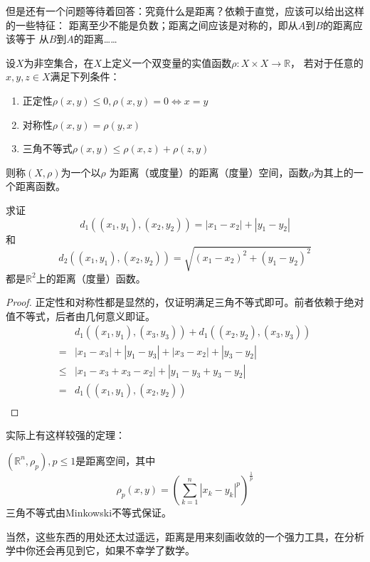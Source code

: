 但是还有一个问题等待着回答：究竟什么是距离？依赖于直觉，应该可以给出这样的一些特征：
距离至少不能是负数；距离之间应该是对称的，即从\(A\)到\(B\)的距离应该等于
从\(B\)到\(A\)的距离……
\begin{definition}[距离空间]
    设$X$为非空集合，在$X$上定义一个双变量的实值函数\(\rho:X\times X\rightarrow\mathbb{R}\)，
    若对于任意的\(x,y,z\in X\)满足下列条件：
    \begin{enumerate}
        \setlength{\itemsep}{-\itemsep}
        \item 正定性\(\rho(x,y)\leq 0,\rho(x,y)=0\Leftrightarrow x=y\)
        \item 对称性\(\rho(x,y)=\rho(y,x)\)
        \item 三角不等式\(\rho(x,y)\leq \rho(x,z)+\rho(z,y)\)
    \end{enumerate}
    则称\((X,\rho)\)为一个以\(\rho\) 为距离（或度量）的距离（度量）空间，函数\(\rho\)为其上的一个距离函数。
\end{definition}
\begin{example}求证
  \[ d_1((x_1,y_1),(x_2,y_2))=|x_1-x_2|+|y_1-y_2|\]和
    \[d_2((x_1,y_1),(x_2,y_2))=\sqrt{(x_1-x_2)^2+(y_1-y_2)^2}\]都是\(\mathbb{R}^2\)上的距离（度量）函数。
\end{example}
\begin{proof}
    正定性和对称性都是显然的，仅证明满足三角不等式即可。前者依赖于绝对值不等式，后者由几何意义即证。
    \begin{align*}
        &d_1((x_1,y_1),(x_3,y_3))+ d_1((x_2,y_2),(x_3,y_3))\\
        =&|x_1-x_3|+|y_1-y_3|+|x_3-x_2|+|y_3-y_2|\\
        \leq&|x_1-x_3+x_3-x_2|+|y_1-y_3+y_3-y_2|\\
        =&d_1((x_1,y_1),(x_2,y_2))\\
    \end{align*}
\end{proof}
实际上有这样较强的定理：
\begin{theorem}
    \((\mathbb{R}^n,\rho_p),p\leq 1\)是距离空间，其中
    \[\rho_p(x,y)=\left(\sum_{k=1}^{n}|x_k-y_k|^p\right)^{\frac{1}{p}}\]
    三角不等式由Minkowski不等式保证。
\end{theorem}

当然，这些东西的用处还太过遥远，距离是用来刻画收敛的一个强力工具，在分析学中你还会再见到它，如果不幸学了数学。

\clearpage








